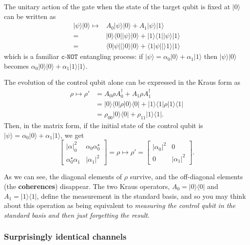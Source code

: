 \documentclass[fleqn]{article}
\begin{document}
The unitary action of the gate when the state of the target qubit is fixed at \(|0\rangle\) can be written as
\[
  \begin{aligned}
    |\psi\rangle|0\rangle
    \longmapsto
    & A_0|\psi\rangle|0\rangle + A_1|\psi\rangle|1\rangle
  \\=& |0\rangle\langle 0||\psi\rangle|0\rangle + |1\rangle\langle 1||\psi\rangle|1\rangle
  \\=& \langle 0|\psi||\rangle 0\rangle|0\rangle + \langle 1|\psi||\rangle 1\rangle|1\rangle
  \end{aligned}
\]
which is a familiar \(\texttt{c-NOT}\) entangling process: if \(|\psi\rangle=\alpha_0|0\rangle+\alpha_1|1\rangle\) then \(|\psi\rangle|0\rangle\) becomes \(\alpha_0|0\rangle|0\rangle+\alpha_1|1\rangle|1\rangle\).

The evolution of the control qubit alone can be expressed in the Kraus form as
\[
  \begin{aligned}
    \rho \longmapsto \rho'
    &= A_0\rho A_0^\dagger + A_1\rho A_1^\dagger
  \\&= |0\rangle\langle 0|\rho|0\rangle\langle 0| + |1\rangle\langle 1|\rho|1\rangle\langle 1|
  \\&= \rho_{00}|0\rangle\langle 0| + \rho_{11}|1\rangle\langle 1|.
  \end{aligned}
\]
Then, in the matrix form, if the initial state of the control qubit is \(|\psi\rangle=\alpha_0|0\rangle+\alpha_1|1\rangle\), we get
\[
  \begin{bmatrix}
    |\alpha|_0^2 & \alpha_0\alpha_0^\star
  \\\alpha_0^\star\alpha_1 & |\alpha_1|^2
  \end{bmatrix}
  = \rho
  \longmapsto
  \rho' =
  \begin{bmatrix}
    |\alpha_0|^2 & 0
  \\0 & |\alpha_1|^2
  \end{bmatrix}.
\]

As we can see, the diagonal elements of \(\rho\) survive, and the off-diagonal elements (the \textbf{coherences}) disappear.
The two Kraus operators, \(A_0=|0\rangle\langle 0|\) and \(A_1=|1\rangle\langle 1|\), define the measurement in the standard basis, and so you may think about this operation as being equivalent to \emph{measuring the control qubit in the standard basis and then just forgetting the result}.

\hypertarget{surprisingly-identical-channels}{%
\subsubsection{Surprisingly identical channels}\label{surprisingly-identical-channels}}
\end{document}
